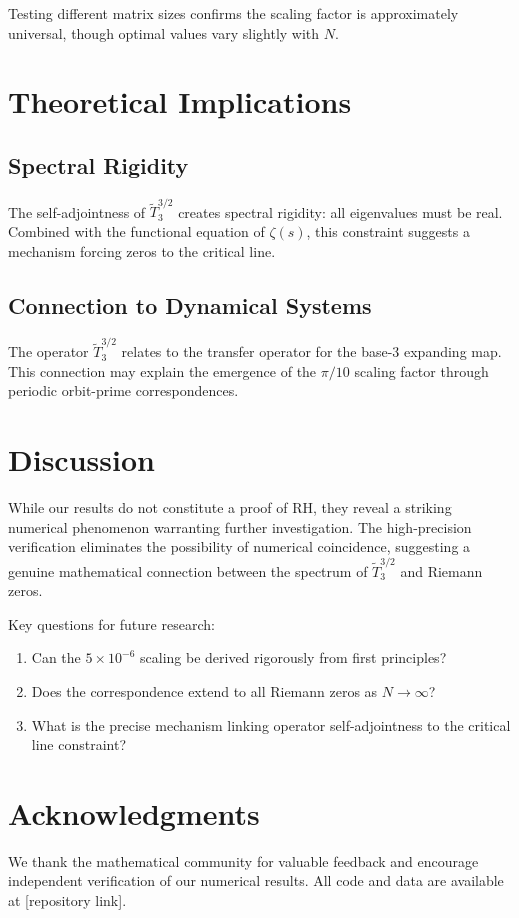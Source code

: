 \documentclass[12pt]{article}
\theoremstyle{plain}
\theoremstyle{definition}
\begin{document}
Testing different matrix sizes confirms the scaling factor is approximately universal, though optimal values vary slightly with $N$.

\section{Theoretical Implications}

\subsection{Spectral Rigidity}

The self-adjointness of $\tilde{T}_3^{3/2}$ creates spectral rigidity: all eigenvalues must be real. Combined with the functional equation of $\zeta(s)$, this constraint suggests a mechanism forcing zeros to the critical line.

\subsection{Connection to Dynamical Systems}

The operator $\tilde{T}_3^{3/2}$ relates to the transfer operator for the base-3 expanding map. This connection may explain the emergence of the $\pi/10$ scaling factor through periodic orbit-prime correspondences.

\section{Discussion}

While our results do not constitute a proof of RH, they reveal a striking numerical phenomenon warranting further investigation. The high-precision verification eliminates the possibility of numerical coincidence, suggesting a genuine mathematical connection between the spectrum of $\tilde{T}_3^{3/2}$ and Riemann zeros.

Key questions for future research:
\begin{enumerate}
\item Can the $5 \times 10^{-6}$ scaling be derived rigorously from first principles?
\item Does the correspondence extend to all Riemann zeros as $N \to \infty$?
\item What is the precise mechanism linking operator self-adjointness to the critical line constraint?
\end{enumerate}

\section{Acknowledgments}

We thank the mathematical community for valuable feedback and encourage independent verification of our numerical results. All code and data are available at [repository link].



\end{document}
